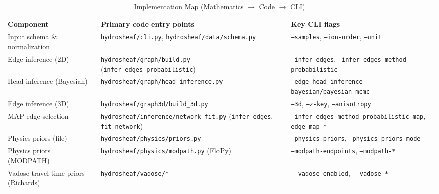 \documentclass[12pt,a4paper]{article}
\theoremstyle{plain}
\theoremstyle{definition}
\theoremstyle{remark}
\begin{document}
\begin{table}[htbp]
	\centering
	\caption{Implementation Map (Mathematics $\rightarrow$ Code $\rightarrow$ CLI)}
	\label{tab:impl_map}
	\begin{tabular}{p{} p{} p{}}
		\toprule
		\textbf{Component}                   & \textbf{Primary code entry points}                                                                   & \textbf{Key CLI flags}                                                             \\
		\midrule
		Input schema \& normalization        & \texttt{hydrosheaf/cli.py}, \texttt{hydrosheaf/data/schema.py}                                       & \texttt{--samples}, \texttt{--ion-order}, \texttt{--unit}                          \\
		Edge inference (2D)                  & \texttt{hydrosheaf/graph/build.py} (\texttt{infer\_edges\_probabilistic})                            & \texttt{--infer-edges}, \texttt{--infer-edges-method probabilistic}                \\
		Head inference (Bayesian)            & \texttt{hydrosheaf/graph/head\_inference.py}                                                         & \texttt{--edge-head-inference bayesian/bayesian\_mcmc}                             \\
		Edge inference (3D)                  & \texttt{hydrosheaf/graph3d/build\_3d.py}                                                             & \texttt{--3d}, \texttt{--z-key}, \texttt{--anisotropy}                             \\
		MAP edge selection                   & \texttt{hydrosheaf/inference/network\_fit.py} (\texttt{infer\_edges}, \texttt{fit\_network})         & \texttt{--infer-edges-method probabilistic\_map}, \texttt{--edge-map-*}            \\
		Physics priors (file)                & \texttt{hydrosheaf/physics/priors.py}                                                                & \texttt{--physics-priors}, \texttt{--physics-priors-mode}                          \\
		Physics priors (MODPATH)             & \texttt{hydrosheaf/physics/modpath.py} (FloPy)                                                       & \texttt{--modpath-endpoints}, \texttt{--modpath-*}                                 \\
		Vadose travel-time priors (Richards) & \nolinkurl{hydrosheaf/vadose/*}                                                                      & \nolinkurl{--vadose-enabled}, \nolinkurl{--vadose-*}                               \\

\end{tabular}
\end{table}
\end{document}
